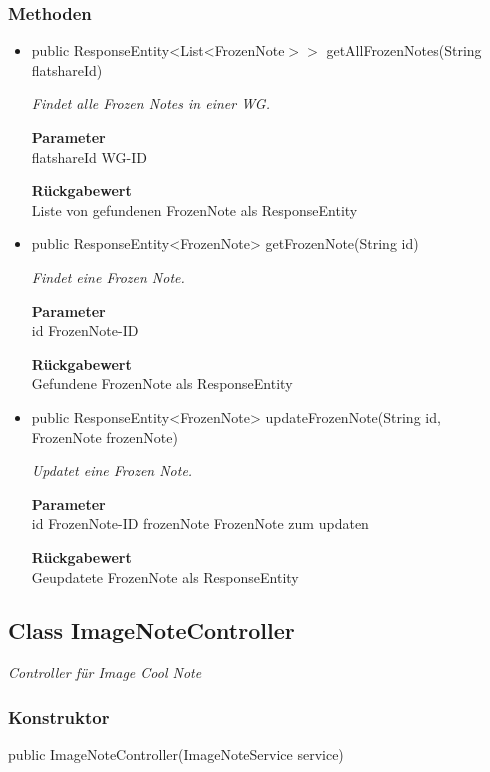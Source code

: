 \documentclass[a4paper]{scrreprt}
\begin{document}
        \subsubsection{Methoden}
        \begin{itemize}
        	\item{public ResponseEntity<List<FrozenNote$>>$ getAllFrozenNotes(String flatshareId)}
        	
        	\textit{Findet alle Frozen Notes in einer WG.}
        	
        	\textbf{Parameter} \\
        	flatshareId WG-ID
        	
        	\textbf{Rückgabewert} \\
        	Liste von gefundenen FrozenNote als ResponseEntity        \item{public ResponseEntity<FrozenNote> getFrozenNote(String id)}
        	
        	\textit{Findet eine Frozen Note.}
        	
        	\textbf{Parameter} \\
        	id FrozenNote-ID
        	
        	\textbf{Rückgabewert} \\
        	Gefundene FrozenNote als ResponseEntity        \item{public ResponseEntity<FrozenNote> updateFrozenNote(String id, FrozenNote frozenNote)}
        	
        	\textit{Updatet eine Frozen Note.}
        	
        	\textbf{Parameter} \\
        	id FrozenNote-ID
        	frozenNote FrozenNote zum updaten
        	
        	\textbf{Rückgabewert} \\
        	Geupdatete FrozenNote als ResponseEntity
        \end{itemize}
        \subsection{Class ImageNoteController}
        \textit{Controller für Image Cool Note}
        \subsubsection{Konstruktor}
        public ImageNoteController(ImageNoteService service)
\end{document}
